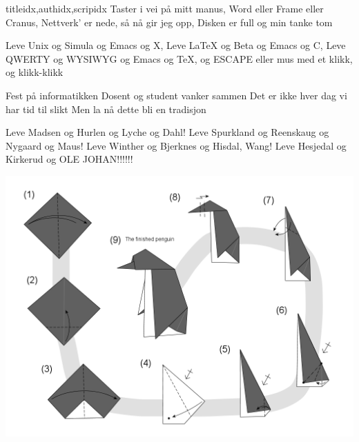 \documentclass[14pt,letterpaper,norsk]{article}
\begin{document}
\begin{songs}{titleidx,authidx,scripidx}
\beginverse
Taster i vei på mitt manus,
Word eller Frame eller Cranus,
Nettverk' er nede, så nå gir jeg opp,
Disken er full og min tanke tom
\endverse

\beginchorus
Leve Unix og Simula og Emacs og X,
Leve \LaTeX{} og Beta og Emacs og C,
Leve QWERTY og WYSIWYG og Emacs og \TeX{},
og ESCAPE eller mus med et klikk, og klikk-klikk
\endchorus

\beginverse
Fest på informatikken
Dosent og student vanker sammen
Det er ikke hver dag vi har tid til slikt
Men la nå dette bli en tradisjon
\endverse

\beginchorus
Leve Madsen og Hurlen og Lyche og Dahl!
Leve Spurkland og Reenskaug og Nygaard og Maus!
Leve Winther og Bjerknes og Hisdal, Wang!
Leve Hesjedal og Kirkerud og OLE JOHAN!!!!!!
\endchorus
\endsong

\end{songs}

\newpage

\includegraphics[width=\textwidth]{penguin_diag.png}
\end{document}
